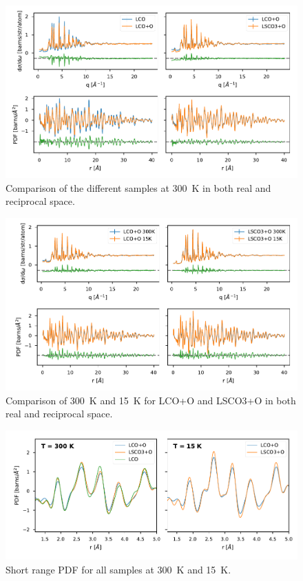 \begin{figure}[H]
    \centering
    \includegraphics[width=\textwidth]{fig/pdf/sample_comparison.pdf}
    \caption{Comparison of the different samples at \SI{300}{\kelvin} in both real and reciprocal space.}
    \label{fig:sample_comparision}    
\end{figure}

\begin{figure}[H]
    \centering
    \includegraphics[width=\textwidth]{fig/pdf/temperature_comparison.pdf}
    \caption{Comparison of \SI{300}{\kelvin} and \SI{15}{\kelvin} for LCO+O and LSCO3+O in both real and reciprocal space.}
    \label{fig:temperature_comparision}    
\end{figure}

\begin{figure}[H]
    \centering
    \includegraphics[width=\textwidth]{fig/pdf/medium_range_pdf.pdf}
    \caption{Short range PDF for all samples at \SI{300}{\kelvin} and \SI{15}{\kelvin}.}
    \label{fig:medium_range_pdf}    
\end{figure}

